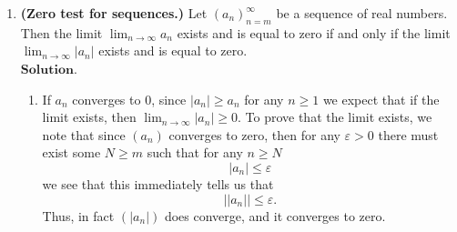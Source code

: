 \documentclass{article}
\theoremstyle{remark}
\begin{document}
\begin{enumerate}
        \item \textbf{(Zero test for sequences.)}
        Let $(a_n)_{n=m}^\infty$ be a sequence of real numbers. Then the limit $\lim_{n \to \infty} a_n$ exists and is equal to zero if and only if the limit $\lim_{n \to \infty} |a_n|$ exists and is equal to zero.
        \\ $\textbf{Solution.}$
        \begin{enumerate}
            \item[$(\implies)$]
            If $a_n$ converges to 0, since $\vert a_n \vert \geq a_n$ for any $n \geq 1$ we expect that 
            if the limit exists, then $\lim_{n\to\infty}\vert a_n \vert \geq 0$.
            To prove that the limit exists, we note that since $(a_n)$ converges to zero, then for 
            any $\varepsilon > 0$ there must exist some $N \geq m$ such that for any $n \geq N$
            \[
            \vert a_n \vert \leq \varepsilon
            \]
            we see that this immediately tells us that 
            \[
            \vert \vert a_n \vert \vert \leq \varepsilon.
            \]
            Thus, in fact $(\vert a_n \vert)$ does converge, and it converges to zero.

            
            

\end{enumerate}
\end{enumerate}
\end{document}
